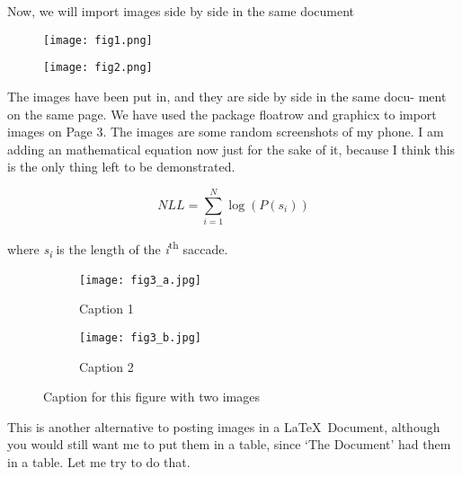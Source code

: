 \documentclass[15pt,a4paper]{article}
\begin{document}
\par
\vspace{5mm}

Now, we will import images side by side in the same document
\newpage



\begin{figure}
\centering
\begin{minipage}{.5\textwidth}
  \centering
  \texttt{[image: fig1.png]}
  \label{fig:test1}
\end{minipage}%
\begin{minipage}{.5\textwidth}
  \centering
  \texttt{[image: fig2.png]}
  \label{fig:test2}
\end{minipage}
\end{figure}

\par
The images have been put in, and they are side by side in the same docu-
ment on the same page. We have used the package floatrow and graphicx to
import images on Page 3. The images are some random screenshots of my
phone. I am adding an mathematical equation now just for the sake of it,
because I think this is the only thing left to be demonstrated.

\begin{equation} \label{nll}
NLL=\sum_{i=1}^{N}\log(P(s_i))
\end{equation}

\begin{flushleft}
where
\textit{s\textsubscript{i}} 
is the length of the \textit{i}\textsuperscript{th} saccade.
\end{flushleft}

\newpage

\begin{figure}
    \centering
    \begin{subfigure}[b]{0.4\textwidth}
        \centering
        \texttt{[image: fig3\_a.jpg]}
        \caption{Caption 1}
    \end{subfigure}
    \hfill
    \begin{subfigure}[b]{0.4\textwidth}
        \centering
        \texttt{[image: fig3\_b.jpg]}
        \caption{Caption 2}
    \end{subfigure}
    \caption{Caption for this figure with two images}
\end{figure}


This is another alternative to posting images in a \LaTeX \ Document, although you would still want me to put them in a table, since ‘The Document’
had them in a table. Let me try to do that.
\end{document}
